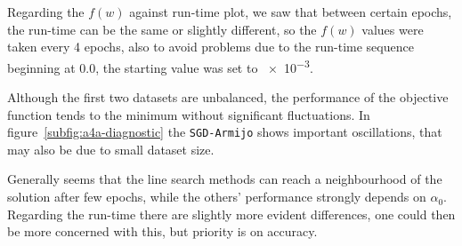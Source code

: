 Regarding the $f(w)$ against run-time plot, we saw that between certain epochs, the run-time can be the same or slightly different, so the $f(w)$ values were taken every 4 epochs, also to avoid problems due to the run-time sequence beginning at \num{0.0}, the starting value was set to \num{e-3}.\par\smallskip




Although the first two datasets are unbalanced, the performance of the objective function tends to the minimum without significant fluctuations. In figure~\ref{subfig:a4a-diagnostic} the \texttt{SGD-Armijo} shows important oscillations, that may also be due to small dataset size.


Generally seems that the line search methods can reach a neighbourhood of the solution after few epochs, while the others' performance strongly depends on $\alpha_0$. Regarding the run-time there are slightly more evident differences, one could then be more concerned with this, but priority is on accuracy.


